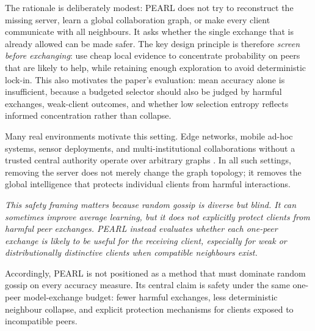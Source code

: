 \documentclass[conference]{IEEEtran}
\begin{document}
The rationale is deliberately modest: PEARL does not try to reconstruct the missing server, learn a global collaboration graph, or make every client communicate with all neighbours. It asks whether the single exchange that is already allowed can be made safer. The key design principle is therefore \emph{screen before exchanging}: use cheap local evidence to concentrate probability on peers that are likely to help, while retaining enough exploration to avoid deterministic lock-in. This also motivates the paper's evaluation: mean accuracy alone is insufficient, because a budgeted selector should also be judged by harmful exchanges, weak-client outcomes, and whether low selection entropy reflects informed concentration rather than collapse.

Many real environments motivate this setting. Edge networks, mobile ad-hoc systems, sensor deployments, and multi-institutional collaborations without a trusted central authority operate over arbitrary graphs \cite{yuan2023decentralized}. In all such settings, removing the server does not merely change the graph topology; it removes the global intelligence that protects individual clients from harmful interactions.

\textit{This safety framing matters because random gossip is diverse but blind. It can sometimes improve average learning, but it does not explicitly protect clients from harmful peer exchanges. PEARL instead evaluates whether each one-peer exchange is likely to be useful for the receiving client, especially for weak or distributionally distinctive clients when compatible neighbours exist.}

Accordingly, PEARL is not positioned as a method that must dominate random gossip on every accuracy measure. Its central claim is safety under the same one-peer model-exchange budget: fewer harmful exchanges, less deterministic neighbour collapse, and explicit protection mechanisms for clients exposed to incompatible peers.
\end{document}
